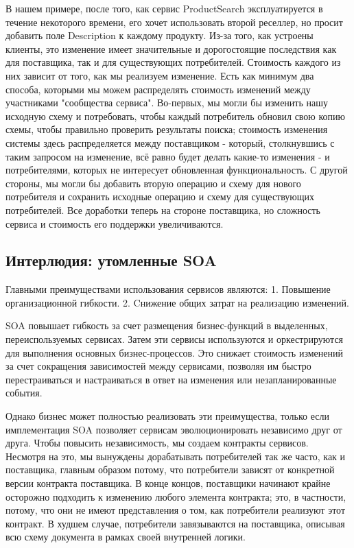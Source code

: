 \documentclass[11pt]{article}
\begin{document}
В нашем примере, после того, как сервис ProductSearch эксплуатируется в
течение некоторого времени, его хочет использовать второй реселлер, но
просит добавить поле Description к каждому продукту. Из-за того, как
устроены клиенты, это изменение имеет значительные и дорогостоящие
последствия как для поставщика, так и для существующих потребителей.
Стоимость каждого из них зависит от того, как мы реализуем изменение.
Есть как минимум два способа, которыми мы можем распределять стоимость
изменений между участниками "сообщества сервиса". Во-первых, мы могли бы
изменить нашу исходную схему и потребовать, чтобы каждый потребитель
обновил свою копию схемы, чтобы правильно проверить результаты поиска;
стоимость изменения системы здесь распределяется между поставщиком -
который, столкнувшись с таким запросом на изменение, всё равно будет
делать какие-то изменения - и потребителями, которых не интересует
обновленная функциональность. С другой стороны, мы могли бы добавить
вторую операцию и схему для нового потребителя и сохранить исходные
операцию и схему для существующих потребителей. Все доработки теперь на
стороне поставщика, но сложность сервиса и стоимость его поддержки
увеличиваются.

\subsection{Интерлюдия: утомленные
SOA}\label{ux438ux43dux442ux435ux440ux43bux44eux434ux438ux44f-ux443ux442ux43eux43cux43bux435ux43dux43dux44bux435-soa}

Главными преимуществами использования сервисов являются: 1. Повышение
организационной гибкости. 2. Cнижение общих затрат на реализацию
изменений.

SOA повышает гибкость за счет размещения бизнес-функций в выделенных,
переиспользуемых сервисах. Затем эти сервисы используются и
оркестрируются для выполнения основных бизнес-процессов. Это снижает
стоимость изменений за счет сокращения зависимостей между сервисами,
позволяя им быстро перестраиваться и настраиваться в ответ на изменения
или незапланированные события.

Однако бизнес может полностью реализовать эти преимущества, только если
имплементация SOA позволяет сервисам эволюционировать независимо друг от
друга. Чтобы повысить независимость, мы создаем контракты сервисов.
Несмотря на это, мы вынуждены дорабатывать потребителей так же часто,
как и поставщика, главным образом потому, что потребители зависят от
конкретной версии контракта поставщика. В конце концов, поставщики
начинают крайне осторожно подходить к изменению любого элемента
контракта; это, в частности, потому, что они не имеют представления о
том, как потребители реализуют этот контракт. В худшем случае,
потребители завязываются на поставщика, описывая всю схему документа в
рамках своей внутренней логики.
\end{document}
